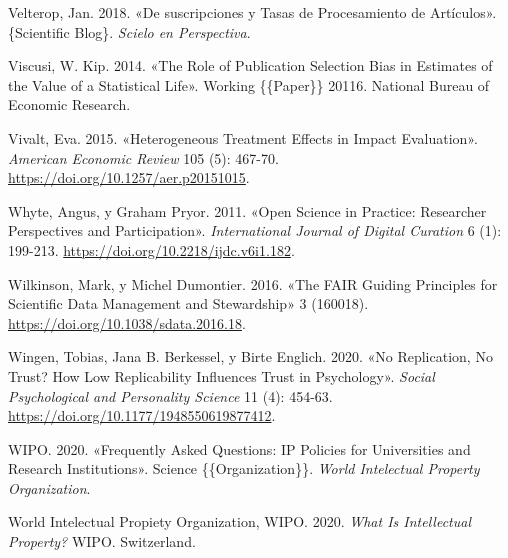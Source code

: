 \documentclass[
  spanish,
  letterpaper,
  DIV=11,
  numbers=noendperiod]{scrreprt}
\newlength{\cslhangindent}
\newenvironment{CSLReferences}[2] %
 {\begin{list}{}{%
  \setlength{\itemindent}{0pt}
  \setlength{\leftmargin}{0pt}
  \setlength{\parsep}{0pt}
  \ifodd #1
   \setlength{\leftmargin}{\cslhangindent}
   \setlength{\itemindent}{-1\cslhangindent}
  \fi
  \setlength{\itemsep}{#2\baselineskip}}}
 {\end{list}}
\begin{document}
\begin{CSLReferences}{1}{0}
Velterop, Jan. 2018. {«{De suscripciones y Tasas de Procesamiento de
Art{í}culos}»}. \{Scientific Blog\}. \emph{Scielo en Perspectiva}.

Viscusi, W. Kip. 2014. {«The {Role} of {Publication Selection Bias} in
{Estimates} of the {Value} of a {Statistical Life}»}. Working
\{\{Paper\}\} 20116. National Bureau of Economic Research.

Vivalt, Eva. 2015. {«Heterogeneous {Treatment Effects} in {Impact
Evaluation}»}. \emph{American Economic Review} 105 (5): 467-70.
\url{https://doi.org/10.1257/aer.p20151015}.

Whyte, Angus, y Graham Pryor. 2011. {«Open {Science} in {Practice}:
{Researcher Perspectives} and {Participation}»}. \emph{International
Journal of Digital Curation} 6 (1): 199-213.
\url{https://doi.org/10.2218/ijdc.v6i1.182}.

Wilkinson, Mark, y Michel Dumontier. 2016. {«The {FAIR Guiding
Principles} for Scientific Data Management and Stewardship»} 3 (160018).
\url{https://doi.org/10.1038/sdata.2016.18}.

Wingen, Tobias, Jana B. Berkessel, y Birte Englich. 2020. {«No
{Replication}, {No Trust}? {How Low Replicability Influences Trust} in
{Psychology}»}. \emph{Social Psychological and Personality Science} 11
(4): 454-63. \url{https://doi.org/10.1177/1948550619877412}.

WIPO. 2020. {«Frequently {Asked Questions}: {IP Policies} for
{Universities} and {Research Institutions}»}. Science
\{\{Organization\}\}. \emph{World Intelectual Property Organization}.

World Intelectual Propiety Organization, WIPO. 2020. \emph{What Is
Intellectual Property?} WIPO. Switzerland.

\end{CSLReferences}
\end{document}
